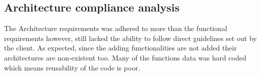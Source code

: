 \documentclass{article}
\begin{document}
\subsection{Architecture compliance analysis}
The Architecture requirements was adhered to more than the functional requirements however, still lacked the ability to follow direct guidelines set out by the client. As expected, since the adding functionalities are not added their architectures are non-existent too. Many of the functions data was hard coded which means reusability of the code is poor. 
\end{document}
